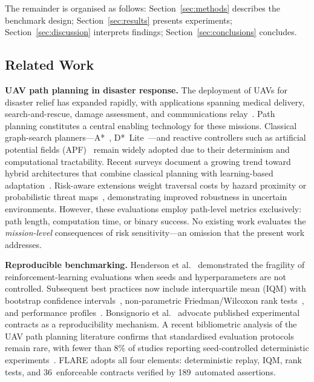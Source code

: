 \documentclass[drones,article,submit,moreauthors]{Definitions/mdpi}
\begin{document}
The remainder is organised as follows: Section~\ref{sec:methods} describes the
benchmark design; Section~\ref{sec:results} presents experiments;
Section~\ref{sec:discussion} interprets findings; Section~\ref{sec:conclusions}
concludes.

\subsection{Related Work}\label{sec:related}

\textbf{UAV path planning in disaster response.}
The deployment of UAVs for disaster relief has expanded rapidly, with
applications spanning medical delivery, search-and-rescue, damage
assessment, and communications
relay~\cite{Erdelj2017,Yucesoy2025,LiWildfire2024}. Path planning
constitutes a central enabling technology for these missions. Classical
graph-search planners---A*~\cite{Hart1968},
D*~Lite~\cite{Koenig2002}---and reactive controllers such as artificial
potential fields (APF)~\cite{Khatib1986} remain widely adopted due to
their determinism and computational tractability. Recent surveys document
a growing trend toward hybrid architectures that combine classical
planning with learning-based
adaptation~\cite{Meng2025,Dradoum2025,Aggarwal2020,Patra2025}. Risk-aware
extensions weight traversal costs by hazard proximity or probabilistic
threat maps~\cite{Zhou2025,Melissaris2025,Karaagac2025,Chen2024fire},
demonstrating improved robustness in uncertain environments. However,
these evaluations employ path-level metrics exclusively: path length,
computation time, or binary success. No existing work evaluates the
\emph{mission-level} consequences of risk sensitivity---an omission
that the present work addresses.

\textbf{Reproducible benchmarking.}
Henderson et al.~\cite{Henderson2018} demonstrated the fragility of
reinforcement-learning evaluations when seeds and hyperparameters are not
controlled. Subsequent best practices now include interquartile mean
(IQM) with bootstrap confidence intervals~\cite{Agarwal2021},
non-parametric Friedman/Wilcoxon rank tests~\cite{Demsar2006}, and
performance profiles~\cite{Dolan2002}. Bonsignorio et
al.~\cite{Bonsignorio2025} advocate published experimental contracts as
a reproducibility mechanism. A recent bibliometric analysis of the UAV
path planning literature confirms that standardised evaluation
protocols remain rare, with fewer than 8\% of studies reporting
seed-controlled deterministic
experiments~\cite{Bouzid2025}. FLARE adopts all four elements:
deterministic replay, IQM, rank tests, and 36~enforceable contracts
verified by 189~automated assertions.
\end{document}
